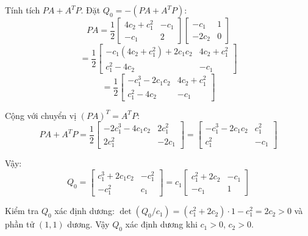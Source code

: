 \documentclass[12pt,a4paper]{report}
\begin{document}
Tính tích $PA + A^T P$. Đặt $Q_0 = -(PA + A^T P)$:
\begin{equation}
PA = \frac{1}{2} \begin{bmatrix} 4c_2 + c_1^2 & -c_1 \\ -c_1 & 2 \end{bmatrix} \begin{bmatrix} -c_1 & 1 \\ -2c_2 & 0 \end{bmatrix}
\end{equation}
\begin{equation}
= \frac{1}{2} \begin{bmatrix} -c_1(4c_2 + c_1^2) + 2c_1 c_2 & 4c_2 + c_1^2 \\ c_1^2 - 4c_2 & -c_1 \end{bmatrix}
\end{equation}
\begin{equation}
= \frac{1}{2} \begin{bmatrix} -c_1^3 - 2c_1 c_2 & 4c_2 + c_1^2 \\ c_1^2 - 4c_2 & -c_1 \end{bmatrix}
\end{equation}

Cộng với chuyển vị $(PA)^T = A^T P$:
\begin{equation}
PA + A^T P = \frac{1}{2} \begin{bmatrix} -2c_1^3 - 4c_1 c_2 & 2c_1^2 \\ 2c_1^2 & -2c_1 \end{bmatrix}
= \begin{bmatrix} -c_1^3 - 2c_1 c_2 & c_1^2 \\ c_1^2 & -c_1 \end{bmatrix}
\end{equation}

Vậy:
\begin{equation}
Q_0 = \begin{bmatrix} c_1^3 + 2c_1 c_2 & -c_1^2 \\ -c_1^2 & c_1 \end{bmatrix}
= c_1 \begin{bmatrix} c_1^2 + 2c_2 & -c_1 \\ -c_1 & 1 \end{bmatrix}
\end{equation}

Kiểm tra $Q_0$ xác định dương: $\det(Q_0 / c_1) = (c_1^2 + 2c_2) \cdot 1 - c_1^2 = 2c_2 > 0$ và phần tử $(1,1)$ dương. Vậy $Q_0$ xác định dương khi $c_1 > 0$, $c_2 > 0$.
\end{document}
